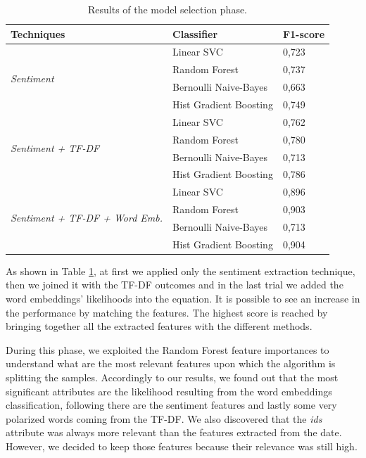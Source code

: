 \documentclass[conference]{IEEEtran}
\begin{document}
\begin{table}[h]
\begin{tabular}{@{}lll@{}}
\toprule
\textbf{Techniques}                                     & \textbf{Classifier}                       & \textbf{F1-score} \\ \midrule
\multirow{4}{*}{\textit{Sentiment}}                     & Linear SVC                       & 0,723    \\
                                               & Random Forest         & 0,737    \\
                                               & Bernoulli Naive-Bayes            & 0,663    \\
                                               & Hist Gradient Boosting & 0,749    \\ \midrule
\multirow{4}{*}{\textit{Sentiment + TF-DF}}             & Linear SVC                       & 0,762    \\
                                               & Random Forest         & 0,780    \\
                                               & Bernoulli Naive-Bayes            & 0,713    \\
                                               & Hist Gradient Boosting & 0,786    \\ \midrule
\multirow{4}{*}{\textit{Sentiment + TF-DF + Word Emb.}} & Linear SVC                       & 0,896    \\
                                               & Random Forest         & 0,903    \\
                                               & Bernoulli Naive-Bayes            & 0,713    \\
                                               & Hist Gradient Boosting & 0,904    \\ \bottomrule
\end{tabular}
\caption{Results of the model selection phase.}
\label{tab:techniques}
\end{table}
As shown in Table \ref{tab:techniques}, at first we applied only the sentiment extraction technique, then we joined it with the TF-DF outcomes and in the last trial we added the word embeddings' likelihoods into the equation. It is possible to see an increase in the performance by matching the features. The highest score is reached by bringing together all the extracted features with the different methods.

During this phase, we exploited the Random Forest feature importances to understand what are the most relevant features upon which the algorithm is splitting the samples. Accordingly to our results, we found out that the most significant attributes are the likelihood resulting from the word embeddings classification, following there are the sentiment features and lastly some very polarized words coming from the TF-DF. We also discovered that the \textit{ids} attribute was always more relevant than the features extracted from the date. However, we decided to keep those features because their relevance was still high.
\end{document}
